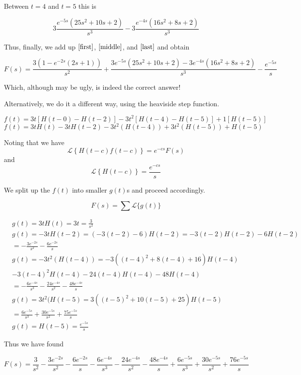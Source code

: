 \documentclass{article}
\begin{document}
Between $t=4$ and $t=5$ this is

\begin{equation}\label{middle}
3\frac{e^{-5s}\left(25s^2+10s+2\right)}{s^3} - 3\frac{e^{-4s}\left(16s^2+8s+2\right)}{s^3}
\end{equation}

Thus, finally, we add up $\eqref{first}$, $\eqref{middle}$, and $\eqref{last}$ and obtain

$$
F(s) = \frac{3(1-e^{-2s}(2s+1))}{s^2} + \frac{3e^{-5s}\left(25s^2+10s+2\right) - 3e^{-4s}\left(16s^2+8s+2\right)}{s^3} - \frac{e^{-5s}}{s}
$$

Which, although may be ugly, is indeed the correct answer!

Alternatively, we do it a different way, using the heaviside step function.


$$f(t) = 3t \left[ H(t-0)-H(t-2)\right ] -3t^2 \left[ H(t-4) - H(t-5) \right] + 1 \left[ H(t-5) \right]$$
$$f(t) = 3tH(t) - 3tH(t-2) - 3t^2(H(t-4)) + 3t^2(H(t-5)) + H(t-5)$$

Noting that we have
$$ \mathcal{L} \left\{ H(t-c) f(t-c) \right\} = e^{-cs} F(s)$$
and
$$ \mathcal{L} \left\{H(t-c)\right\} = \frac{e^{-cs}}{s}$$

We split up the $f(t)$ into smaller $g(t)$s and proceed accordingly.

$$F(s) = \sum \mathcal{L}\{g(t)\}$$

\begin{align*}
&g(t) = 3tH(t) = 3t = \frac{3}{s^2} \\
&g(t) = -3tH(t-2) = (-3 (t-2)-6)H(t-2) =-3(t-2)H(t-2)-6H(t-2) \\
&= -\frac{3e^{-2s}}{s^2} - \frac{6e^{-2s}}{s} \\
& g(t) = -3t^2(H(t-4)) = -3((t-4)^2+8(t-4)+16)H(t-4) \\
& -3(t-4)^2H(t-4)-24(t-4)H(t-4)-48H(t-4) \\
&= -\frac{6e^{-4s}}{s^3}-\frac{24e^{-4s}}{s^2}-\frac{48e^{-4s}}{s} \\
&g(t) = 3t^2(H(t-5) =  3((t-5)^2+10(t-5)+25)H(t-5) \\
&= \frac{6e^{-5s}}{s^3}+\frac{30e^{-5s}}{s^2}+\frac{75e^{-5s}}{s} \\
&g(t) = H(t-5) = \frac{e^{-5s}}{s}
\end{align*}

Thus we have found

$$F(s) = \frac{3}{s^2} -\frac{3e^{-2s}}{s^2} - \frac{6e^{-2s}}{s} -\frac{6e^{-4s}}{s^3}-\frac{24e^{-4s}}{s^2}-\frac{48e^{-4s}}{s} + \frac{6e^{-5s}}{s^3}+\frac{30e^{-5s}}{s^2}+\frac{76e^{-5s}}{s}$$
\end{document}
